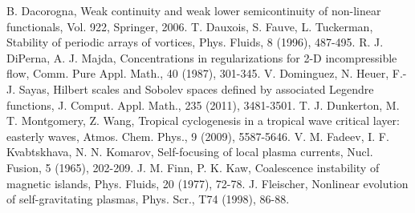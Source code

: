 \documentclass[1 [leqno, 11pt]{amsart}
\numberwithin{equation}{section}
\begin{document}
\begin{CJK*}{GBK}{song}
\begin{thebibliography}{99}
  B. Dacorogna, Weak continuity and weak lower semicontinuity of non-linear functionals, Vol. 922, Springer, 2006.
 T. Dauxois, S. Fauve, L. Tuckerman,  Stability of periodic arrays of vortices, Phys. Fluids, 8 (1996), 487-495.
 R. J. DiPerna,  A. J. Majda, Concentrations in regularizations for 2-D incompressible flow, Comm. Pure Appl. Math., 40 (1987),  301-345.
   V. Dominguez, N. Heuer, F.-J. Sayas,  Hilbert scales and Sobolev spaces defined by associated Legendre functions,
    J. Comput. Appl. Math.,
235 (2011),  3481-3501.
T. J. Dunkerton, M. T. Montgomery, Z. Wang,  Tropical cyclogenesis in a tropical wave critical layer: easterly waves, Atmos. Chem. Phys., 9  (2009), 5587-5646.
 V. M. Fadeev, I. F. Kvabtskhava, N. N. Komarov,
 Self-focusing of local plasma currents,
Nucl. Fusion, 5 (1965), 202-209.
  J. M. Finn, P. K. Kaw, Coalescence instability of magnetic islands, Phys. Fluids,  20 (1977), 72-78.
 J. Fleischer, Nonlinear evolution of self-gravitating plasmas,  Phys. Scr.,  T74 (1998), 86-88.


\end{thebibliography}
\end{CJK*}
\end{document}
